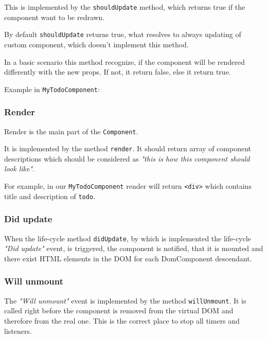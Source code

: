       This is implemented by the \texttt{shouldUpdate} method, which returns true if the component want to be redrawn. 

      By default \texttt{shouldUpdate} returns true, 
      what resolves to always updating of custom component, which doesn't implement this method.

      In a basic scenario this method recognize, 
      if the component will be rendered differently with the new props.  
      If not, it return false, else it return true.

      Example in \texttt{MyTodoComponent}:
      

    \subsubsection{Render}\label{subsec:our-architecture-lifecycle-render}

      Render is the main part of the \texttt{Component}. 

      It is implemented by the method \texttt{render}.
      It should return array of component descriptions which should be considered as 
      \textit{"this is how this component should look like"}.

      For example, in our \texttt{MyTodoComponent} render will return \texttt{<div>} which contains title and description of \texttt{todo}.
      

    \subsubsection{Did update}\label{subsec:our-architecture-lifecycle-didupdate}

      When the life-cycle method \texttt{didUpdate}, 
      by which is implemented the  life-cycle \textit{"Did update"} event, 
      is triggered, the component is notified, 
      that it is mounted and there exist HTML elements in the DOM for each DomComponent descendant.

    \subsubsection{Will unmount}\label{subsec:our-architecture-lifecycle-willunmount}

      The \textit{"Will unmount"} event is implemented by the method \texttt{willUnmount}.
      It is called right before the component is removed from the virtual DOM and therefore from the real one. 
      This is the correct place to stop all timers and listeners.


